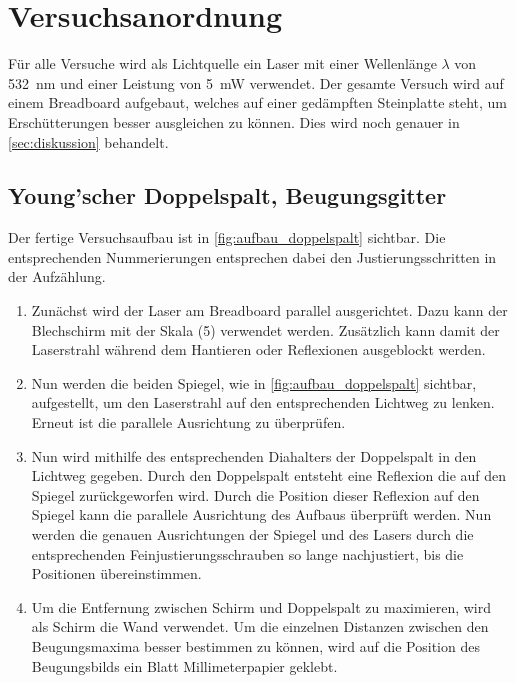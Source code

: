\documentclass[12pt,english,ngerman]{scrartcl}
\begin{document}
\section{Versuchsanordnung}\label{sec:versuchsanordnung}

Für alle Versuche wird als Lichtquelle ein Laser mit einer Wellenlänge $\lambda$ von \SI{532}{\nano\meter} und einer 
Leistung von \SI{5}{\milli\watt} verwendet. Der gesamte Versuch wird auf einem Breadboard aufgebaut, welches auf einer 
gedämpften Steinplatte steht, um Erschütterungen besser ausgleichen zu können. Dies wird noch genauer in \autoref{sec:diskussion}
behandelt.
\subsection{Young'scher Doppelspalt, Beugungsgitter}

Der fertige Versuchsaufbau ist in \autoref{fig:aufbau_doppelspalt} sichtbar. Die entsprechenden Nummerierungen entsprechen dabei den 
Justierungsschritten in der Aufzählung.

\begin{enumerate}
    \item Zunächst wird der Laser am Breadboard parallel ausgerichtet. Dazu kann der Blechschirm mit der Skala (5) verwendet 
    werden. Zusätzlich kann damit der Laserstrahl während dem Hantieren oder Reflexionen ausgeblockt werden.
    \item Nun werden die beiden Spiegel, wie in \autoref{fig:aufbau_doppelspalt} sichtbar, aufgestellt, um den Laserstrahl 
    auf den entsprechenden Lichtweg zu lenken. Erneut ist die parallele Ausrichtung zu überprüfen.
    \item Nun wird mithilfe des entsprechenden Diahalters der Doppelspalt in den Lichtweg gegeben. Durch den Doppelspalt 
    entsteht eine Reflexion die auf den Spiegel zurückgeworfen wird. Durch die Position dieser Reflexion auf den Spiegel 
    kann die parallele Ausrichtung des Aufbaus überprüft werden. Nun werden die genauen Ausrichtungen der Spiegel und des 
    Lasers durch die entsprechenden Feinjustierungsschrauben so lange nachjustiert, bis die Positionen übereinstimmen.
    \item Um die Entfernung zwischen Schirm und Doppelspalt zu maximieren, wird als Schirm die Wand verwendet. Um die einzelnen 
    Distanzen zwischen den Beugungsmaxima besser bestimmen zu können, wird auf die Position des Beugungsbilds ein Blatt 
    Millimeterpapier geklebt.
\end{enumerate}
\end{document}
